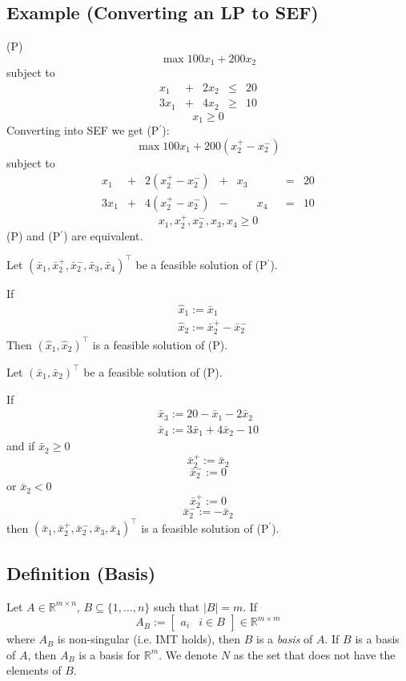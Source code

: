 \subsection{Example (Converting an LP to SEF)}
(P)
\[\max 100x_1+200x_2\]
subject to
\[
\begin{array}{ccccc}
    x_1 & + & 2x_2 & \le & 20\\
    3x_1 & + & 4x_2 & \ge & 10
\end{array}
\]
\[x_1 \ge 0\]
Converting into SEF we get (P$^\prime$):
\[\max 100x_1+200(x_2^+-x_2^-)\]
subject to
\[
\begin{array}{ccccccccc}
    x_1 & + & 2(x_2^+-x_2^-) & + & x_3 & & & = & 20\\
    3x_1 & + & 4(x_2^+-x_2^-) & - & & x_4 & & = & 10
\end{array}
\]
\[x_1,x_2^+,x_2^-,x_3,x_4\ge 0\]
(P) and (P$^\prime$) are equivalent.

Let
$(\bar{x}_1, \bar{x}_2^+, \bar{x}_2^-, \bar{x}_3, \bar{x}_4)^\top$
be a feasible solution of (P$^\prime$).


If
\begin{align*}
    &\hat{x}_1:=\bar{x}_1\\
    &\hat{x}_2:=\bar{x}_2^+-\bar{x}_2^-
\end{align*}
Then 
$(\hat{x}_1,\hat{x}_2)^\top$
is a feasible solution of (P).

Let
$(\bar{x}_1, \bar{x}_2)^\top$
be a feasible solution of (P).

If
\begin{align*}
    \bar{x}_3:=20-\bar{x}_1-2\bar{x}_2\\
    \bar{x}_4:=3\bar{x}_1+4\bar{x}_2-10
\end{align*}
and 
if $\bar{x}_2\ge 0$
\[\bar{x}_2^+:=\bar{x}_2\]
\[\bar{x}_2^-:=0\]
or $\bar{x}_2< 0$
\[\bar{x}_2^+:=0\]
\[\bar{x}_2^-:=-\bar{x}_2\]
then $(\bar{x}_1,\bar{x}_2^+,\bar{x}_2^-,\bar{x}_3,\bar{x}_4)^\top$
is a feasible solution of (P$^\prime$).

\begin{defbox}
    \subsection{Definition (Basis)}
    Let $A\in \mathbb{R}^{m\times n}$, $B\subseteq\{1,\dots,n\}$ such that $|B|=m$. If
    \[A_B:= \left[\begin{array}{c|c} a_i & i\in B \end{array}\right]
        \in \mathbb{R}^{m\times m}
    \]
    where $A_B$ is non-singular (i.e. IMT holds), then $B$ is a \emph{basis} of $A$.
    If $B$ is a basis of $A$, then $A_B$ is a basis for $\mathbb{R}^m$. We
    denote $N$ as the set that does not have the elements of $B$.
\end{defbox}

